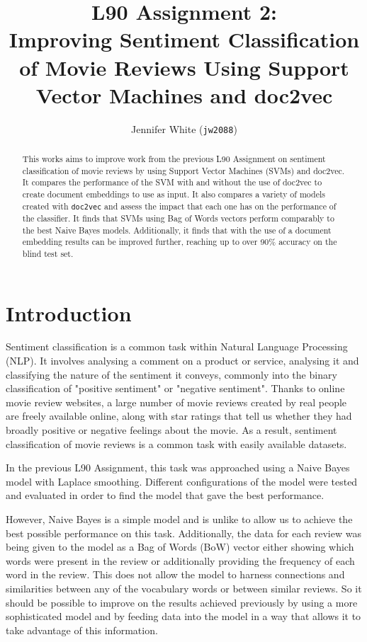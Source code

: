 \documentclass[twocolumn]{article}
\title{ L90 Assignment 2:\\
	Improving Sentiment Classification of Movie Reviews Using Support Vector Machines and doc2vec }
\author{Jennifer White (\texttt{jw2088})}
\begin{document}
\maketitle
\begin{abstract}
This works aims to improve work from the previous L90 Assignment on sentiment classification of movie reviews by using Support Vector Machines (SVMs) and doc2vec. It compares the performance of the SVM with and without the use of doc2vec to create document embeddings to use as input. It also compares a variety of models created with \texttt{doc2vec} and assess the impact that each one has on the performance of the classifier. It finds that SVMs using Bag of Words vectors perform comparably to the best Naive Bayes models. Additionally, it finds that with the use of a document embedding results can be improved further, reaching up to over 90\% accuracy on the blind test set.
\end{abstract}

\section{Introduction}

Sentiment classification is a common task within Natural Language Processing (NLP). It involves analysing a comment on a product or service, analysing it and classifying the nature of the sentiment it conveys, commonly into the binary classification of "positive sentiment" or "negative sentiment". Thanks to online movie review websites, a large number of movie reviews created by real people are freely available online, along with star ratings that tell us whether they had broadly positive or negative feelings about the movie. As a result, sentiment classification of movie reviews is a common task with easily available datasets.

In the previous L90 Assignment, this task was approached using a Naive Bayes model with Laplace smoothing. Different configurations of the model were tested and evaluated in order to find the model that gave the best performance.

However, Naive Bayes is a simple model and is unlike to allow us to achieve the best possible performance on this task. Additionally, the data for each review was being given to the model as a Bag of Words (BoW) vector either showing which words were present in the review or additionally providing the frequency of each word in the review. This does not allow the model to harness connections and similarities between any of the vocabulary words or between similar reviews. So it should be possible to improve on the results achieved previously by using a more sophisticated model and by feeding data into the model in a way that allows it to take advantage of this information.
\end{document}
